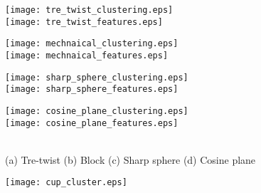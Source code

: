 \documentclass[10pt,journal,cspaper,compsoc]{IEEEtran}
\begin{document}
\begin{figure*}
\centering
\begin{minipage}{0.22\textwidth}
\centering
\texttt{[image: tre\_twist\_clustering.eps]}\\
\vspace{4pt}
\texttt{[image: tre\_twist\_features.eps]}\\
\end{minipage} \hspace{10pt}
\begin{minipage}{0.12\textwidth}
\centering
\texttt{[image: mechnaical\_clustering.eps]}\\
\vspace{4pt}
\texttt{[image: mechnaical\_features.eps]}\\
\end{minipage} \hspace{10pt}
\begin{minipage}{0.22\textwidth}
\centering
\vspace{10pt}
\texttt{[image: sharp\_sphere\_clustering.eps]}\\
\vspace{10pt}
\texttt{[image: sharp\_sphere\_features.eps]}\\
\end{minipage} \hspace{10pt}
\begin{minipage}{0.24\textwidth}
\centering
\vspace{20pt}
\texttt{[image: cosine\_plane\_clustering.eps]}\\
\vspace{20pt}
\texttt{[image: cosine\_plane\_features.eps]}\\
\end{minipage}\\ \vspace{4pt}
\hspace{0.02\textwidth} (a) Tre-twist  \hspace{0.09\textwidth} (b) Block   \hspace{0.09\textwidth} (c) Sharp sphere  \hspace{0.12\textwidth}(d) Cosine plane\\ \vspace{8pt}
\begin{minipage}{0.2\textwidth}
\centering
\vspace{20pt}
\texttt{[image: cup\_cluster.eps]}\\

\end{minipage}
\end{figure*}
\end{document}
